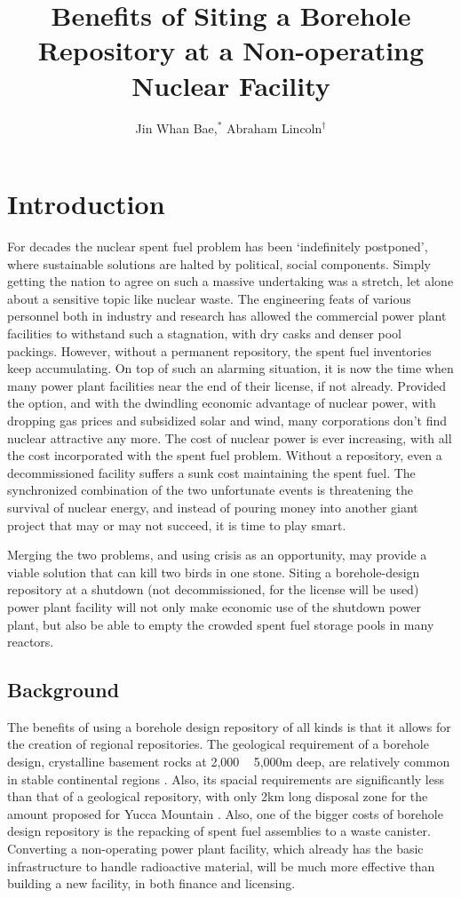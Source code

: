 \documentclass{anstrans}
\title{Benefits of Siting a Borehole Repository at a Non-operating Nuclear 
Facility}
\author{Jin Whan Bae,$^{*}$ Abraham Lincoln$^{\dagger}$}
\institute{
$^{*}$Dept. of Nuclear Plasma, and Radiological Engineering, University of Illinois at Urbana-Champaign, Urbana, IL
\and
$^{\dagger}$State Capitol Building, Springfield, IL
}
\begin{document}
\section{Introduction}

For decades the nuclear spent fuel problem has been `indefinitely postponed', where sustainable solutions are halted by political, social components. Simply getting the nation to agree on such a massive undertaking was a stretch, let alone about a sensitive topic like nuclear waste. The engineering feats of various personnel both in industry and research has allowed the commercial power plant facilities to withstand such a stagnation, with dry casks and denser pool packings. However, without a permanent repository, the spent fuel inventories keep accumulating.
On top of such an alarming situation, it is now the time when many power plant facilities near the end of their license, if not already. Provided the option, and with the dwindling economic advantage of nuclear power, with dropping gas prices and subsidized solar and wind, many corporations don't find nuclear attractive any more. The cost of nuclear power is ever increasing, with all the cost incorporated with the spent fuel problem. Without a repository, even a decommissioned facility suffers a sunk cost maintaining the spent fuel.
The synchronized combination of the two unfortunate events is threatening the survival of nuclear energy, and instead of pouring money into another giant project that may or may not succeed, it is time to play smart.

Merging the two problems, and using crisis as an opportunity, may provide a viable solution that can kill two birds in one stone.
Siting a borehole-design repository at a shutdown (not decommissioned, for the license will be used) power plant facility will not only make economic use of the shutdown power plant, but also be able to empty the crowded spent fuel storage pools in many reactors.


\subsection{Background}

The benefits of using a borehole design repository of all kinds is that it allows for the creation of regional repositories. The geological requirement of a borehole design, crystalline basement rocks at 2,000 ~ 5,000m deep, are relatively common in stable continental regions \cite{arnold_geological_2016}. Also, its spacial requirements are significantly less than that of a geological repository, with only 2km long disposal zone for the amount proposed for Yucca Mountain \cite{brady_deep_2009}.
Also, one of the bigger costs of borehole design repository is the repacking of spent fuel assemblies to a waste canister. Converting a non-operating power plant facility, which already has the basic infrastructure to handle radioactive material, will be much more effective than building a new facility, in both finance and licensing. 
\end{document}
